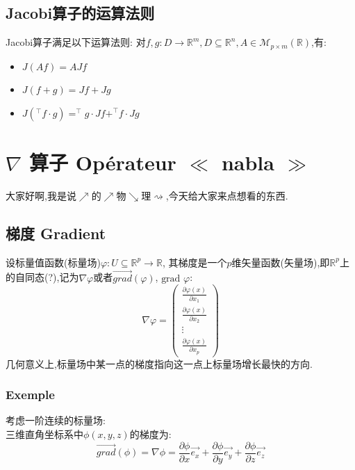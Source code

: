 \documentclass[12pt, a4paper, oneside]{ctexbook}
\begin{document}
    \subsection{Jacobi算子的运算法则}
    Jacobi算子满足以下运算法则:
    对$f,g:D\rightarrow \mathbb{R}^m, D\subseteq\mathbb{R}^n,A\in\mathcal{M}_{p\times m}(\mathbb{R})$,有:
    \begin{itemize}
      \item $J(Af)=AJf$
      \item $J(f+g)=Jf+Jg$
      \item $J(^\top f\cdot g)=^\top g\cdot Jf+^\top f\cdot Jg$
    \end{itemize}
\section{$\nabla$ 算子 Opérateur $\ll$ nabla $\gg$ }%
    大家好啊,我是说$\nearrow $的$\nearrow $物$\searrow $理$\rightsquigarrow $,今天给大家来点想看的东西.
  \subsection{梯度 Gradient}
    设标量值函数(标量场)$\varphi:U\subseteq \mathbb{R}^p \rightarrow \mathbb{R}$,
    其梯度是一个$p$维矢量函数(矢量场),即$\mathbb{R}^p$上的自同态(?),记为$\nabla \varphi$或者$\overrightarrow{grad} (\varphi)$, $\text{grad } \varphi$:
    $$
    \nabla \varphi=
    \begin{pmatrix}
      \frac{\partial \varphi(x)}{\partial x_1}\\
      \frac{\partial \varphi(x)}{\partial x_2}\\
      \vdots \\
      \frac{\partial \varphi(x)}{\partial x_p}
    \end{pmatrix}
    $$
    几何意义上,标量场中某一点的梯度指向这一点上标量场增长最快的方向.
    \subsubsection{Exemple}
    考虑一阶连续的标量场:\\


    三维直角坐标系中$\phi(x,y,z)$的梯度为:
    $$
    \overrightarrow{grad} (\phi)=\nabla \phi=\frac{\partial \phi}{\partial x}\overrightarrow{e_x}+\frac{\partial \phi}{\partial y}\overrightarrow{e_y}+\frac{\partial \phi}{\partial z}\overrightarrow{e_z}
    $$
\end{document}
